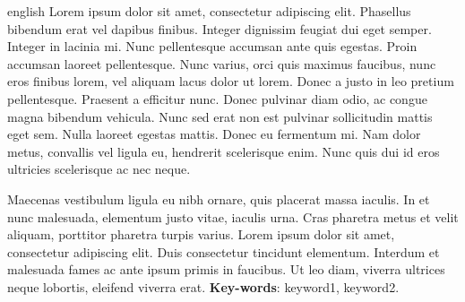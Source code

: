 \begin{resumo}[Abstract]
\begin{otherlanguage*}{english}
Lorem ipsum dolor sit amet, consectetur adipiscing elit. Phasellus bibendum erat vel dapibus finibus. Integer dignissim feugiat dui eget semper. Integer in lacinia mi. Nunc pellentesque accumsan ante quis egestas. Proin accumsan laoreet pellentesque. Nunc varius, orci quis maximus faucibus, nunc eros finibus lorem, vel aliquam lacus dolor ut lorem. Donec a justo in leo pretium pellentesque. Praesent a efficitur nunc. Donec pulvinar diam odio, ac congue magna bibendum vehicula. Nunc sed erat non est pulvinar sollicitudin mattis eget sem. Nulla laoreet egestas mattis. Donec eu fermentum mi. Nam dolor metus, convallis vel ligula eu, hendrerit scelerisque enim. Nunc quis dui id eros ultricies scelerisque ac nec neque.

Maecenas vestibulum ligula eu nibh ornare, quis placerat massa iaculis. In et nunc malesuada, elementum justo vitae, iaculis urna. Cras pharetra metus et velit aliquam, porttitor pharetra turpis varius. Lorem ipsum dolor sit amet, consectetur adipiscing elit. Duis consectetur tincidunt elementum. Interdum et malesuada fames ac ante ipsum primis in faucibus. Ut leo diam, viverra ultrices neque lobortis, eleifend viverra erat. 
\vspace{\onelineskip}
   \noindent 
   \textbf{Key-words}: keyword1, keyword2.
\end{otherlanguage*}
\end{resumo}